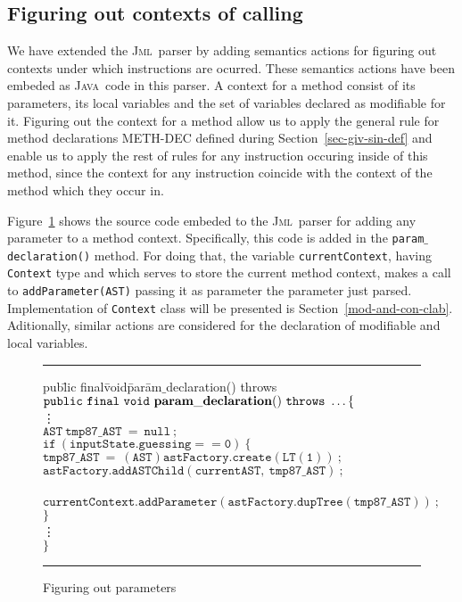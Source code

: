 \documentclass[a4paper]{llncs}
\newcommand{\jml}{\textsc{Jml}}
\newcommand{\java}{\textsc{Java}}
\begin{document}
\subsection{Figuring out contexts of calling}
\label{fig-out-met-cal-con}
We have extended the \jml~parser by adding semantics actions for figuring out contexts under which instructions are ocurred. These semantics actions have been embeded as \java~code in this parser. A context for a method consist of its parameters, its local variables and the set of variables declared as modifiable for it. Figuring out the context for a method allow us to apply the general rule for method declarations \textup{METH-DEC} defined during Section~\ref{sec-giv-sin-def} and enable us to apply the rest of rules for any instruction occuring inside of this method, since the context for any instruction coincide with the context of the method which they occur in.

Figure~\ref{fig-out-par} shows the source code embeded to the \jml~parser for adding any parameter to a method context. Specifically, this code is added in the \texttt{param$\_$declaration()} method. For doing that, the variable \texttt{currentContext}, having \texttt{Context} type and which serves to store the current method context, makes a call to \texttt{addParameter(AST)} passing it as parameter the parameter just parsed. Implementation of \texttt{Context} class will be presented is Section~\ref{mod-and-con-clab}. Aditionally, similar actions are considered for the declaration of modifiable and local variables.
\begin{figure}[hbt]
\rule{\linewidth}{0.25mm}
\begin{tabbing}
pub\=lic final\= void\=par\=am$\_$declaration() throws \kill
\>$\mathtt{public\ final\ void\ {\bf param\_declaration}()\ throws\ \hdots \{ }$ \\
\>\>\vdots \\
\>\>$\mathtt{AST\ tmp87\_AST\ =\ null\ ;}$ \\
\>\>$\mathtt{if\ (inputState.guessing==0)\ \{}$ \\
\>\>\>$\mathtt{tmp87\_AST\ =\ (AST)astFactory.create(LT(1))\ ;}$ \\
\>\>\>$\mathtt{astFactory.addASTChild(currentAST,\ tmp87\_AST)\ ;}$ \\
\>\> \\
\>\>\>$\mathtt{currentContext.addParameter(astFactory.dupTree(tmp87\_AST))\ ;}$ \\
\>\>$\mathtt{\}}$ \\
\>\>\vdots \\
\>$\mathtt{\}}$
\end{tabbing}
\caption{Figuring out parameters}
\label{fig-out-par}
\rule{\linewidth}{0.25mm}
\end{figure}
\end{document}
